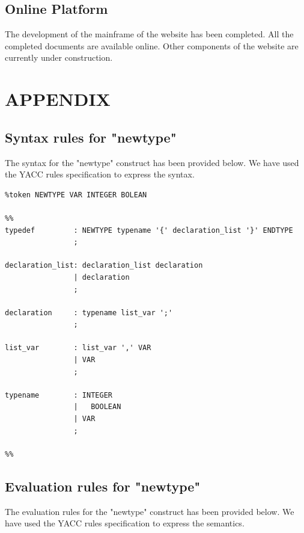 \section{Online Platform}
The development of the mainframe of the website has been completed. All the completed documents are available online. Other components of the website are currently under construction. 

\chapter{APPENDIX}
\section{Syntax rules for "newtype"}
The syntax for the "newtype" construct has been provided below. We have used the YACC rules specification to express the syntax.

\begin{verbatim}
%token NEWTYPE VAR INTEGER BOLEAN

%%
typedef			: NEWTYPE typename '{' declaration_list '}' ENDTYPE
				;

declaration_list: declaration_list declaration
				| declaration
				;

declaration		: typename list_var ';'
				;

list_var		: list_var ',' VAR	
				| VAR				
				;

typename		: INTEGER
				|	BOOLEAN
				| VAR   
				;
				
%%
\end{verbatim}

\section{Evaluation rules for "newtype"}
The evaluation rules for the "newtype" construct has been provided below. We have used the YACC rules specification to express the semantics.

